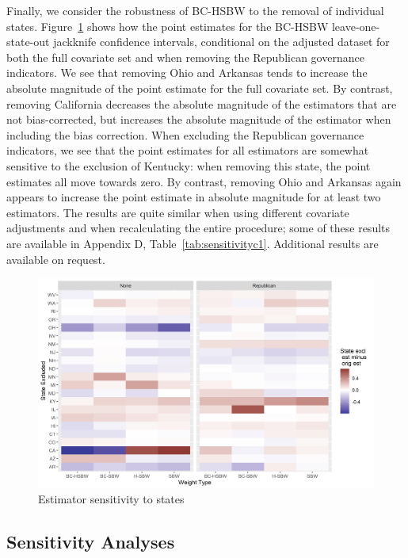 \documentclass[12pt]{article}
\begin{document}
Finally, we consider the robustness of BC-HSBW to the removal of individual states. Figure~\ref{fig:loostateplot} shows how the point estimates for the BC-HSBW leave-one-state-out jackknife confidence intervals, conditional on the adjusted dataset for both the full covariate set and when removing the Republican governance indicators. We see that removing Ohio and Arkansas tends to increase the absolute magnitude of the point estimate for the full covariate set. By contrast, removing California decreases the absolute magnitude of the estimators that are not bias-corrected, but increases the absolute magnitude of the estimator when including the bias correction. When excluding the Republican governance indicators, we see that the point estimates for all estimators are somewhat sensitive to the exclusion of Kentucky: when removing this state, the point estimates all move towards zero. By contrast, removing Ohio and Arkansas again appears to increase the point estimate in absolute magnitude for at least two estimators. The results are quite similar when using different covariate adjustments and when recalculating the entire procedure; some of these results are available in Appendix D, Table~\ref{tab:sensitivityc1}. Additional results are available on request.

\begin{figure}[]
\begin{center}
    \includegraphics[scale=0.6]{01_Plots/c1-loostate-sensitivity.png}
    \caption{Estimator sensitivity to states}
    \label{fig:loostateplot}
\end{center}
\end{figure}

\subsection{Sensitivity Analyses} \label{sssec:sensitivity}
\end{document}
